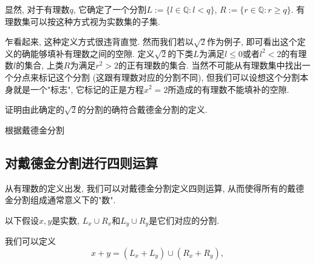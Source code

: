 显然, 对于有理数$q$, 它确定了一个分割$L:=\{l\in\mathbb{Q}:l<q\}$, $R:=\{r\in\mathbb{Q}:r\geq q\}$. 有理数集可以按这种方式视为实数集的子集.

乍看起来, 这种定义方式很违背直觉. 然而我们若以$\sqrt{2}$作为例子, 即可看出这个定义的确能够填补有理数之间的空隙. 定义$\sqrt{2}$的下类$L$为满足$l\leq0$或者$l^2<2$的有理数$l$的集合, 上类$R$为满足$r^2>2$的正有理数的集合. 当然不可能从有理数集中找出一个分点来标记这个分割 (这跟有理数对应的分割不同), 但我们可以设想这个分割本身就是一个"标志", 它标记的正是方程$x^2=2$所造成的有理数不能填补的空隙.
\begin{exercise}{}
证明由此确定的$\sqrt{2}$的分割的确符合戴德金分割的定义.
\end{exercise}

根据戴德金分割

\subsection{对戴德金分割进行四则运算}
从有理数的定义出发, 我们可以对戴德金分割定义四则运算, 从而使得所有的戴德金分割组成通常意义下的"数". 

以下假设$x,y$是实数, $L_x\cup R_x$和$L_y\cup R_y$是它们对应的分割.

我们可以定义
$$
x+y=(L_x+L_y)\cup(R_x+R_y),
$$